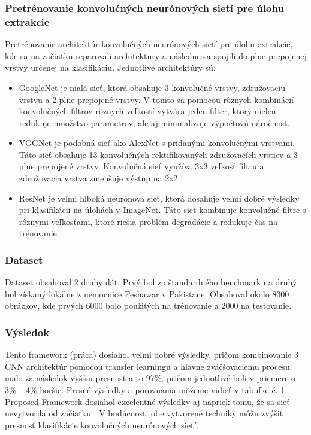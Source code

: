 \subsubsection*{Pretrénovanie konvolučných neurónových sietí pre úlohu extrakcie}
\hspace{10mm}Pretrénovanie architektúr konvolučných neurónových sietí pre úlohu extrakcie, kde sa na začiatku separovali architektury a následne sa spojili do plne prepojenej vrstvy určenej na klasifikáciu. Jednotlivé architektúry sú:
\begin{itemize}
	\item GoogleNet je malá sieť, ktorá obsahuje 3 konvolučné vrstvy, združovaciu vrstvu a 2 plne prepojené vrstvy. V tomto sa pomocou rôznych kombinácií konvolučných filtrov rôznych veľkostí vytvára jeden filter, ktorý nielen redukuje množstvo parametrov, ale aj minimalizuje výpočtovú náročnosť. 
	\item VGGNet je podobná sieť ako AlexNet s pridanými konvolučnými vrstvami. Táto sieť obsahuje 13 konvolučných rektifikovaných  združovacích vrstiev a 3 plne prepojené vrstvy. Konvolučná sieť využíva 3x3 veľkosť filtru a združovacia vrstva zmenšuje výstup na 2x2.  
    \item ResNet je veľmi hlboká neurónová sieť, ktorá dosahuje veľmi dobré výsledky pri klasifikácii na úlohách v ImageNet. Táto sieť kombinuje konvolučné filtre s rôznymi veľkosťami, ktoré riešia problém degradácie a redukuje čas na trénovanie.
\end{itemize}

\subsubsection*{Dataset}
\hspace{10mm}Dataset obsahoval 2 druhy dát. Prvý bol zo štandardného benchmarku a druhý bol získaný lokálne z nemocnice Peshawar v Pakistane. Obsahoval okolo 8000 obrázkov, kde prvých 6000 bolo použitých na trénovanie a 2000 na testovanie.

\subsubsection*{Výsledok}
\hspace{10mm}Tento framework (práca) dosiahol  veľmi dobré výsledky, pričom kombinovanie 3 CNN architektúr pomocou transfer learningu a hlavne zväčšovaciemu procesu malo za následok vyššiu presnosť a to  97\%, pričom jednotlivé boli v priemere o 3\% – 4\% horšie. Presné výsledky a porovnania môžeme vidieť v tabuľke č. 1. Proposed Framework dosiahol excelentné výsledky aj napriek tomu, že sa sieť nevytvorila od začiatku . V budúcnosti obe vytvorené techniky môžu zvýšiť presnosť klasifikácie konvolučných neurónových sietí. \cite{KHAN20191}


